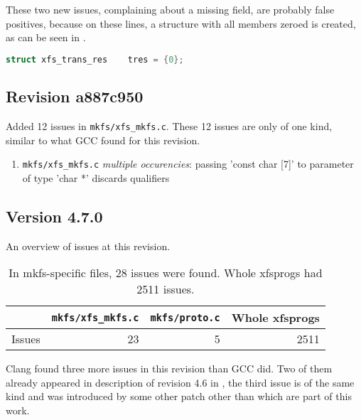These two new issues, complaining about a missing field, are probably false
positives, because on these lines, a structure with all members zeroed is
created, as can be seen in .


\begin{lstlisting}[frame=none, basicstyle=\footnotesize\ttfamily,
language=C, numbers=none, numberstyle=\tiny\color{black},caption=
{One of the two lines on which Clang reports a missing field in structure
initialization.},
label={lst:results:zeroedStruct}]
struct xfs_trans_res    tres = {0};
\end{lstlisting}

\subsection{Revision a887c950}
Added 12 issues in {\tt mkfs/xfs\_mkfs.c}. These 12 issues are only of one
kind, similar to what GCC found for this revision.

\begin{enumerate}
	\item {\tt mkfs/xfs\_mkfs.c} {\em multiple occurencies}: passing
		'const char [7]' to parameter of type 'char *' discards
		qualifiers
\end{enumerate}

\subsection{Version 4.7.0}\label{chap:results:clang:4.7}

An overview of issues at this revision.
\begin{table}[h]
\begin{tabular}{|l||r|r||r|}
\hline
& {\tt mkfs/xfs\_mkfs.c} & {\tt mkfs/proto.c} & Whole xfsprogs \\
\hline
Issues & 23 & 5 & 2511 \\
\hline
\end{tabular}
\caption{In mkfs-specific files, 28 issues were found. Whole
xfsprogs had 2511 issues.}
\end{table}

Clang found three more issues in this revision than GCC did. Two of them
already appeared in description of revision 4.6 in
, the third issue is of the same kind and was
introduced by some other patch other than which are part of this work.


